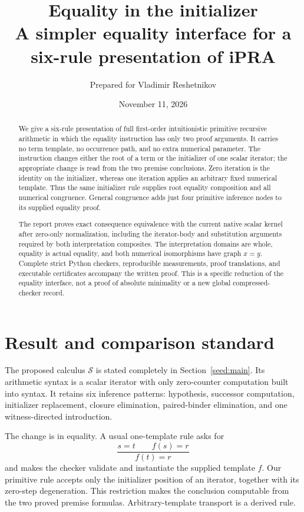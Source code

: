 \documentclass[11pt,a4paper]{article}
\title{\color{ink}Equality in the initializer\\[3pt]
\large A simpler equality interface for a six-rule presentation of iPRA}
\author{Prepared for Vladimir Reshetnikov}
\date{November 11, 2026}
\theoremstyle{definition}
\begin{document}
\maketitle
\begin{abstract}
We give a six-rule presentation of full first-order intuitionistic
primitive recursive arithmetic in which the equality instruction has
only two proof arguments. It carries no term template, no occurrence
path, and no extra numerical parameter. The instruction changes either
the root of a term or the initializer of one scalar iterator; the
appropriate change is read from the two premise conclusions.
Zero iteration is the identity on the initializer, whereas one iteration
applies an arbitrary fixed numerical template. Thus the same initializer
rule supplies root equality composition and all numerical congruence.
General congruence adds just four primitive inference nodes to its
supplied equality proof.

The report proves exact consequence equivalence with the current native
scalar kernel after zero-only normalization, including the iterator-body
and substitution arguments required by both interpretation composites.
The interpretation domains are whole, equality is actual equality,
and both numerical isomorphisms have graph \(x=y\).
Complete strict Python checkers, reproducible measurements, proof
translations, and executable certificates accompany the written proof.
This is a specific reduction of the equality interface, not a proof
of absolute minimality or a new global compressed-checker record.
\end{abstract}
\begingroup
\small
\setlength{\parskip}{0pt}
\setcounter{tocdepth}{1}
\tableofcontents
\endgroup
\newpage

\section{Result and comparison standard}
\label{sec:assessment}

The proposed calculus \(\mathcal S\) is stated completely in
Section~\ref{seed:main}. Its arithmetic syntax is a scalar iterator
with only zero-counter computation built into syntax. It retains six
inference patterns: hypothesis, successor computation, initializer
replacement, closure elimination, paired-binder elimination, and one
witness-directed introduction.

The change is in equality. A usual one-template rule asks for
\[
 \frac{s=t\qquad f(s)=r}{f(t)=r}
\]
and makes the checker validate and instantiate the supplied template
\(f\). Our primitive rule accepts only the initializer position of an
iterator, together with its zero-step degeneration. This restriction
makes the conclusion computable from the two proved premise formulas.
Arbitrary-template transport is a derived rule.
\end{document}
